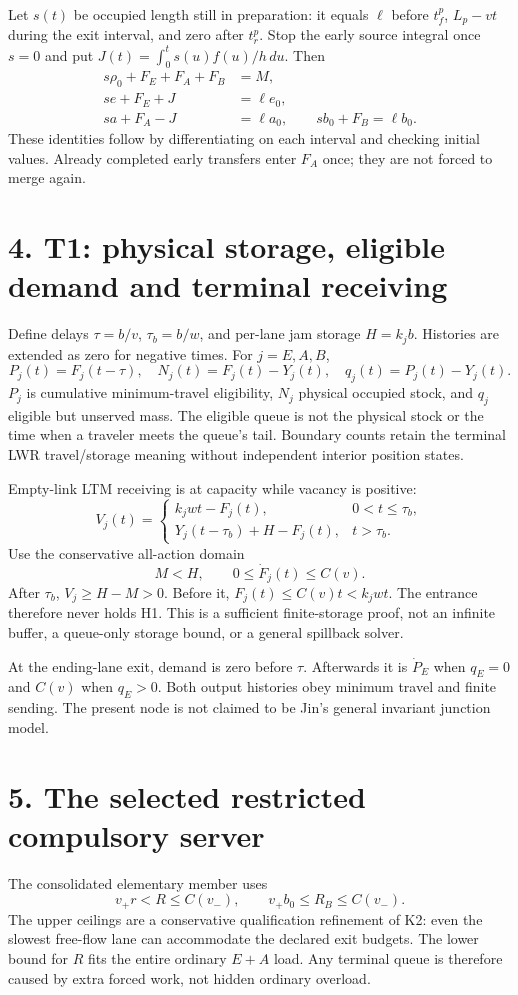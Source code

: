 \documentclass[11pt,a4paper]{article}
\begin{document}
Let $s(t)$ be occupied length still in preparation: it equals $\ell$ before
$t_f^p$, $L_p-vt$ during the exit interval, and zero after $t_r^p$.
Stop the early source integral once $s=0$ and put
$J(t)=\int_0^t s(u)f(u)/h\,du$. Then
\[
 \begin{split}
 s\rho_0+F_E+F_A+F_B&=M,\\
 se+F_E+J&=\ell e_0,\\
 sa+F_A-J&=\ell a_0,\qquad sb_0+F_B=\ell b_0.
 \end{split}
 \tag{9}
\]
These identities follow by differentiating on each interval and checking
initial values. Already completed early transfers enter $F_A$ once;
they are not forced to merge again.

\section*{4. T1: physical storage, eligible demand and terminal receiving}
Define delays $\tau=b/v$, $\tau_b=b/w$, and per-lane jam storage $H=k_jb$.
Histories are extended as zero for negative times. For $j=E,A,B$,
\[
 P_j(t)=F_j(t-\tau),\quad
 N_j(t)=F_j(t)-Y_j(t),\quad
 q_j(t)=P_j(t)-Y_j(t).
 \tag{10}
\]
$P_j$ is cumulative minimum-travel eligibility, $N_j$ physical occupied
stock, and $q_j$ eligible but unserved mass. The eligible queue is not
the physical stock or the time when a traveler meets the queue's tail.
Boundary counts retain the terminal LWR travel/storage meaning without
independent interior position states.

Empty-link LTM receiving is at capacity while vacancy is positive:
\[
 V_j(t)=
 \begin{cases}
 k_jwt-F_j(t),&0<t\leq\tau_b,\\
 Y_j(t-\tau_b)+H-F_j(t),&t>\tau_b .
 \end{cases}
 \tag{11}
\]
Use the conservative all-action domain
\[
 M<H,\qquad 0\leq \dot F_j(t)\leq C(v).
 \tag{12}
\]
After $\tau_b$, $V_j\geq H-M>0$. Before it,
$F_j(t)\leq C(v)t<k_jwt$. The entrance therefore never holds H1.
This is a sufficient finite-storage proof, not an infinite buffer, a
queue-only storage bound, or a general spillback solver.

At the ending-lane exit, demand is zero before $\tau$.
Afterwards it is $\dot P_E$ when $q_E=0$ and $C(v)$ when $q_E>0$.
Both output histories obey minimum travel and finite sending.
The present node is not claimed to be Jin's general invariant junction model.

\section*{5. The selected restricted compulsory server}
The consolidated elementary member uses
\[
 v_+r<R\leq C(v_-),\qquad
 v_+b_0\leq R_B\leq C(v_-).
 \tag{13}
\]
The upper ceilings are a conservative qualification refinement of K2:
even the slowest free-flow lane can accommodate the declared exit budgets.
The lower bound for $R$ fits the entire ordinary $E+A$ load.
Any terminal queue is therefore caused by extra forced work, not hidden
ordinary overload.
\end{document}
